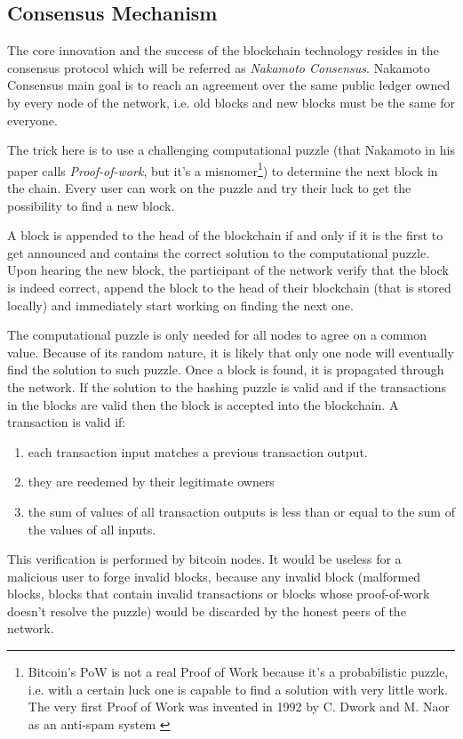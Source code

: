 	\subsection{Consensus Mechanism}
		The core innovation and the success of the blockchain technology resides in the consensus protocol which will be referred as \textit{Nakamoto Consensus}. Nakamoto Consensus main goal is to reach an agreement over the same public ledger owned by every node of the network, i.e. old blocks and new blocks must be the same for everyone.
		
		The trick here is to use a challenging computational puzzle (that Nakamoto in his paper calls \textit{Proof-of-work}, but it's a misnomer\footnote{Bitcoin's PoW is not a real Proof of Work because it's a probabilistic puzzle, i.e. with a certain luck one is capable to find a solution with very little work. The very first Proof of Work was invented in 1992 by C. Dwork and M. Naor as an anti-spam system \cite{Dwork1992}}) to determine the next block in the chain. Every user can work on the puzzle and try their luck to get the possibility to find a new block.
		
		A block is appended to the head of the blockchain if and only if it is the first to get announced and contains the correct solution to the computational puzzle. Upon hearing the new block, the participant of the network verify that the block is indeed correct, append the block to the head of their blockchain (that is stored locally) and immediately start working on finding the next one.
		
		The computational puzzle is only needed for all nodes to agree on a common value. Because of its random nature, it is likely that only one node will eventually find the solution to such puzzle. Once a block is found, it is propagated through the network. If the solution to the hashing puzzle is valid and if the transactions in the blocks are valid then the block is accepted into the blockchain. A transaction is valid if:
		\begin{enumerate}
			\item each transaction input matches a previous transaction output.
			\item they are reedemed by their legitimate owners
			\item the sum of values of all transaction outputs is less than or equal to the sum of the values of all inputs.
		\end{enumerate}		
		This verification is performed by bitcoin nodes. It would be useless for a malicious user to forge invalid blocks, because any invalid block (malformed blocks, blocks that contain invalid transactions or blocks whose proof-of-work doesn't resolve the puzzle) would be discarded by the honest peers of the network. 
		

